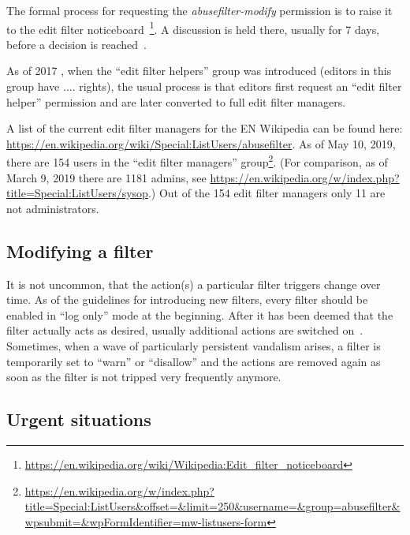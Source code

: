 The formal process for requesting the \emph{abusefilter-modify} permission is to raise it to the edit filter noticeboard~\footnote{\url{https://en.wikipedia.org/wiki/Wikipedia:Edit_filter_noticeboard}}.
A discussion is held there, usually for 7 days, before a decision is reached~\cite{Wikipedia:EditFilter}.

As of 2017%
, when the ``edit filter helpers'' group was introduced (editors in this group have .... rights),
the usual process is that editors first request an ``edit filter helper'' permission and are later converted to full edit filter managers.

A list of the current edit filter managers for the EN Wikipedia can be found here: \url{https://en.wikipedia.org/wiki/Special:ListUsers/abusefilter}.
As of May 10, 2019, there are 154 users in the ``edit filter managers'' group\footnote{\url{https://en.wikipedia.org/w/index.php?title=Special:ListUsers&offset=&limit=250&username=&group=abusefilter&wpsubmit=&wpFormIdentifier=mw-listusers-form}}.
(For comparison, as of March 9, 2019 there are 1181 admins, see \url{https://en.wikipedia.org/w/index.php?title=Special:ListUsers/sysop}.)
Out of the 154 edit filter managers only 11 are not administrators.

\subsection{Modifying a filter}
It is not uncommon, that the action(s) a particular filter triggers change over time.
As of the guidelines for introducing new filters, every filter should be enabled in ``log only'' mode at the beginning.
After it has been deemed that the filter actually acts as desired, usually additional actions are switched on~\cite{Wikipedia:EditFilterInstructions}.
Sometimes, when a wave of particularly persistent vandalism arises, a filter is temporarily set to ``warn'' or ``disallow'' and the actions are removed again as soon as the filter is not tripped very frequently anymore. %


\subsection{Urgent situations}

